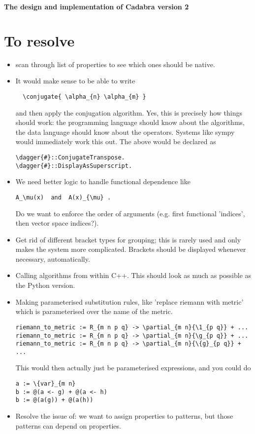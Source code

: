 \documentclass[11pt]{article}
\begin{document}
{\bf The design and implementation of Cadabra version 2}

\section{To resolve}

\begin{itemize}
\item scan through list of properties to see which ones should be
native.

\item It would make sense to be able to write
\begin{lstlisting}
  \conjugate{ \alpha_{n} \alpha_{m} }
\end{lstlisting}
and then apply the conjugation algorithm. Yes, this is precisely how
things should work: the programming language should know about the
algorithms, the data language should know about the operators. Systems
like sympy would immediately work this out. The above would be
declared as
\begin{lstlisting}
\dagger{#}::ConjugateTranspose.
\dagger{#}::DisplayAsSuperscript.
\end{lstlisting}
\item We need better logic to handle functional dependence like
\begin{lstlisting}
A_\mu(x)  and  A(x)_{\mu} .
\end{lstlisting}
Do we want to enforce the order of arguments (e.g. first functional
'indices', then vector space indices?).  

\item Get rid of different bracket types for grouping; this is rarely used and only
makes the system more complicated. Brackets should be displayed
whenever necessary, automatically. 

\item Calling algorithms from within C++. This should look as much as possible
as the Python version.

\item Making parameterised substitution rules, like 'replace riemann with metric' 
which is parameterised over the name of the metric.
\begin{lstlisting}
riemann_to_metric := R_{m n p q} -> \partial_{m n}{\1_{p q}} + ...
riemann_to_metric := R_{m n p q} -> \partial_{m n}{\g_{p q}} + ...
riemann_to_metric := R_{m n p q} -> \partial_{m n}{\{g}_{p q}} + ...
\end{lstlisting}
This would then actually just be parameterised expressions, and you could do
\begin{lstlisting}
a := \{var}_{m n}
b := @(a <- g) + @(a <- h)
b := @(a(g)) + @(a(h))
\end{lstlisting}

\item Resolve the issue of: we want to assign properties to patterns, but those patterns can 
depend on properties.
\end{itemize}
\end{document}
